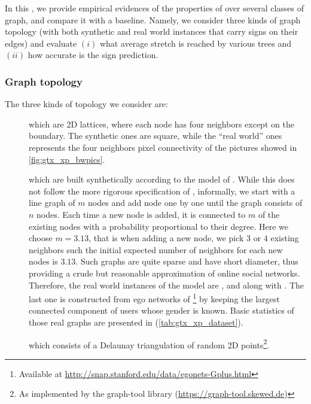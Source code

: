 In this , we provide empirical evidences of the properties of
\gtx{} over several classes of graph, and compare it with a \bfs{} baseline. Namely, we consider three kinds of
graph topology (with both synthetic and real world instances that carry signs on their edges) and
evaluate $(i)$ what average stretch is reached by various trees and $(ii)$ how accurate is the sign
prediction.

\subsubsection{Graph topology}

The three kinds of topology we consider are:
\begin{description}
	\item[\grid{}] which are 2D lattices, where each node has four neighbors except on the boundary.
		The synthetic ones are square, while the \enquote{real world} ones represents the four neighbors
		pixel connectivity of the pictures showed in \autoref{fig:gtx_xp_bwpics}.
	\item[\lpa{}] which are built synthetically according to the model of \textcite{Barabasi1999}.
		While this does not follow the more rigorous specification of \textcite{PAmodel04}, informally,
		we start with a line graph of $m$ nodes and add node one by one until the graph consists of $n$
		nodes. Each time a new node is added, it is connected to $m$ of the existing nodes with a
		probability proportional to their degree. Here we choose $m=3.13$, that is when adding a new
		node, we pick $3$ or $4$ existing neighbors such the initial expected number of neighbors for
		each new nodes is $3.13$. Such graphs are quite sparse and have short diameter, thus providing a
		crude but reasonable approximation of online social networks. Therefore, the real world
		instances of the \lpa{} model are \wik{}, \sla{} and \epi{} along with \gplus{}. The last one is constructed from
		ego networks of \gplus{}\footnote{Available at
		\url{http://snap.stanford.edu/data/egonets-Gplus.html}} by keeping the largest connected
		component of users whose gender is known. Basic statistics of those real \lpa{} graphs are
		presented in (\autoref{tab:gtx_xp_dataset}). 
	\item[\triangle{}] which consists of a Delaunay triangulation of random 2D points\footnote{As
		implemented by the \textsf{graph-tool} library (\url{https://graph-tool.skewed.de})}.
\end{description}

